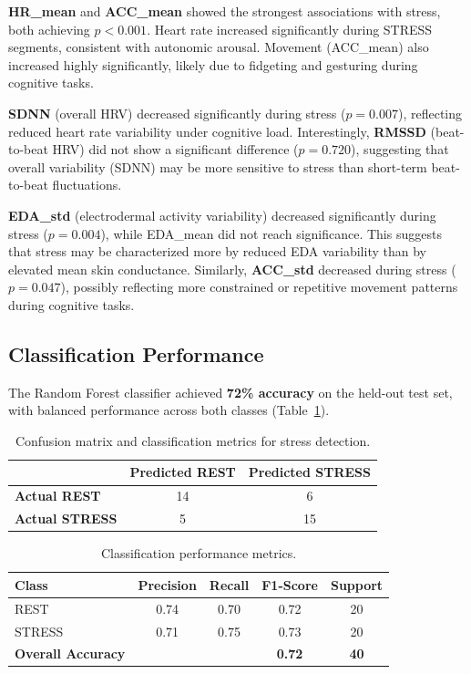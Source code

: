 \documentclass[12pt,letterpaper]{article}
\begin{document}
\textbf{HR\_mean} and \textbf{ACC\_mean} showed the strongest associations with stress, both achieving $p < 0.001$. Heart rate increased significantly during STRESS segments, consistent with autonomic arousal. Movement (ACC\_mean) also increased highly significantly, likely due to fidgeting and gesturing during cognitive tasks.

\textbf{SDNN} (overall HRV) decreased significantly during stress ($p = 0.007$), reflecting reduced heart rate variability under cognitive load. Interestingly, \textbf{RMSSD} (beat-to-beat HRV) did not show a significant difference ($p = 0.720$), suggesting that overall variability (SDNN) may be more sensitive to stress than short-term beat-to-beat fluctuations.

\textbf{EDA\_std} (electrodermal activity variability) decreased significantly during stress ($p = 0.004$), while EDA\_mean did not reach significance. This suggests that stress may be characterized more by reduced EDA variability than by elevated mean skin conductance. Similarly, \textbf{ACC\_std} decreased during stress ($p = 0.047$), possibly reflecting more constrained or repetitive movement patterns during cognitive tasks.

\subsection{Classification Performance}

The Random Forest classifier achieved \textbf{72\% accuracy} on the held-out test set, with balanced performance across both classes (Table~\ref{tab:confusion}).

\begin{table}[H]
\centering
\caption{Confusion matrix and classification metrics for stress detection.}
\label{tab:confusion}
\begin{tabular}{lcc}
\toprule
& \textbf{Predicted REST} & \textbf{Predicted STRESS} \\
\midrule
\textbf{Actual REST}   & 14 & 6  \\
\textbf{Actual STRESS} & 5  & 15 \\
\bottomrule
\end{tabular}
\end{table}

\begin{table}[H]
\centering
\caption{Classification performance metrics.}
\label{tab:metrics}
\begin{tabular}{lcccc}
\toprule
\textbf{Class} & \textbf{Precision} & \textbf{Recall} & \textbf{F1-Score} & \textbf{Support} \\
\midrule
REST    & 0.74 & 0.70 & 0.72 & 20 \\
STRESS  & 0.71 & 0.75 & 0.73 & 20 \\
\midrule
\textbf{Overall Accuracy} & & & \textbf{0.72} & \textbf{40} \\
\bottomrule
\end{tabular}
\end{table}
\end{document}
